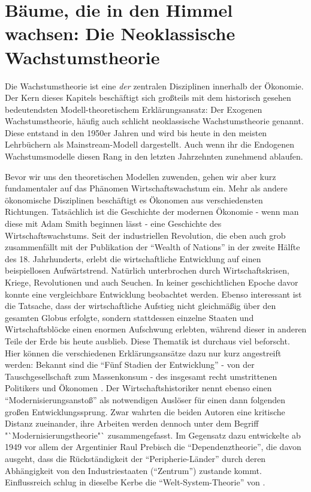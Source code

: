 \section{Bäume, die in den Himmel wachsen: Die Neoklassische Wachstumstheorie}

Die Wachstumstheorie ist eine \textit{der} zentralen Disziplinen innerhalb der Ökonomie. Der Kern dieses Kapitels beschäftigt sich großteils mit dem historisch gesehen bedeutendsten Modell-theoretischem Erklärungsansatz: Der Exogenen Wachstumstheorie, häufig auch schlicht neoklassische Wachstumstheorie genannt. Diese entstand in den 1950er Jahren und wird bis heute in den meisten Lehrbüchern als Mainstream-Modell dargestellt. Auch wenn ihr die Endogenen Wachstumsmodelle diesen Rang in den letzten Jahrzehnten zunehmend ablaufen. 

Bevor wir uns den theoretischen Modellen zuwenden, gehen wir aber kurz fundamentaler auf das Phänomen Wirtschaftswachstum ein. Mehr als andere ökonomische Disziplinen beschäftigt es Ökonomen aus verschiedensten Richtungen. Tatsächlich ist die Geschichte der modernen Ökonomie - wenn man diese mit Adam Smith beginnen lässt - eine Geschichte des Wirtschaftswachstums. Seit der industriellen Revolution, die eben auch grob zusammenfällt mit der Publikation der "`Wealth of Nations"' in der zweite Hälfte des 18. Jahrhunderts, erlebt die wirtschaftliche Entwicklung auf einen beispiellosen Aufwärtstrend. Natürlich unterbrochen durch Wirtschaftskrisen, Kriege, Revolutionen und auch Seuchen. In keiner geschichtlichen Epoche davor konnte eine vergleichbare Entwicklung beobachtet werden. Ebenso interessant ist die Tatsache, dass der wirtschaftliche Aufstieg nicht gleichmäßig über den gesamten Globus erfolgte, sondern stattdessen einzelne Staaten und Wirtschaftsblöcke einen enormen Aufschwung erlebten, während dieser in anderen Teile der Erde bis heute ausblieb. Diese Thematik ist durchaus viel beforscht. Hier können die verschiedenen Erklärungsansätze dazu nur kurz angestreift werden: Bekannt sind die "`Fünf Stadien der Entwicklung"' - von der Tauschgesellschaft zum Massenkonsum - des insgesamt recht umstrittenen Politikers und Ökonomen \textcite{Rostow1960}. Der Wirtschaftshistoriker \textcite{Gerschenkron1962} nennt ebenso einen "`Modernisierungsanstoß"' als notwendigen Auslöser für einen dann folgenden großen Entwicklungssprung. Zwar wahrten die beiden Autoren eine kritische Distanz zueinander, ihre Arbeiten werden dennoch unter dem Begriff "`Modernisierungstheorie"` zusammengefasst. Im Gegensatz dazu entwickelte ab 1949 vor allem der Argentinier Raul Prebisch die "`Dependenztheorie"', die davon ausgeht, dass die Rückständigkeit der "`Peripherie-Länder"' durch deren Abhängigkeit von den Industriestaaten ("`Zentrum"') zustande kommt. Einflussreich schlug in dieselbe Kerbe die "`Welt-System-Theorie"' von \textcite{Wallerstein1974}. 

